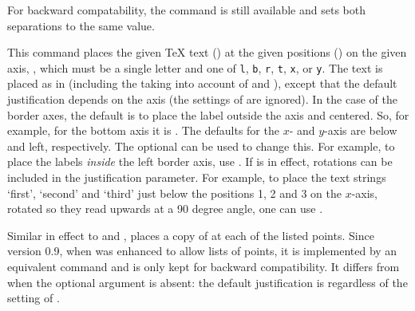 \documentclass[letterpaper]{article}
\begin{document}
For backward compatability, the command  is still
available and sets both separations to the same value.

\begin{cd}
%
\end{cd}

This command places the given \TeX{} text () at the given
positions () on the given axis, , which must be a
single letter and one of \texttt{l}, \texttt{b}, \texttt{r}, \texttt{t},
\texttt{x}, or \texttt{y}. The text is placed as in 
(including the taking into account of  and
), except that the default justification depends on the
axis (the settings of  are ignored). In the case of
the border axes, the default is to place the label outside the axis and
centered. So, for example, for the bottom axis it is . The
defaults for the $x$- and $y$-axis are below and left, respectively. The
optional  can be used to change this. For example, to place
the labels \emph{inside} the left border axis, use . If
 is in effect, rotations can be included in the
justification parameter. For example, to place the text strings
`first', `second' and `third' just below the positions 1, 2 and 3
on the $x$-axis, rotated so they read upwards at a 90 degree angle, one
can use .

\begin{cd}
%
\end{cd}

Similar in effect to  and , 
places a copy of  at each of the listed points. Since \mfp{}
version 0.9, when  was enhanced to allow lists of points, it
is implemented by an equivalent  command and is only kept for
backward compatibility. It differs from  when the optional
argument is absent: the default justification is  regardless of
the setting of .

\begin{cd}
%
\end{cd}
\end{document}
